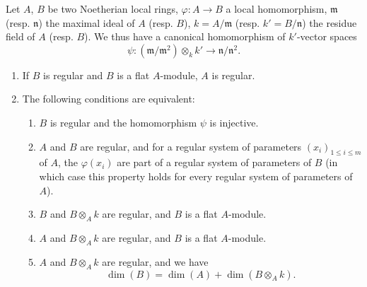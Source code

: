\begin{proposition}[17.3.3]
\label{0.17.3.3}
Let $A$, $B$ be two Noetherian local rings, $\varphi:A\to B$ a local homomorphism, $\mathfrak{m}$ (resp. $\mathfrak{n}$) the maximal ideal of $A$ (resp. $B$), $k=A/\mathfrak{m}$ (resp. $k'=B/\mathfrak{n}$) the residue field of $A$ (resp. $B$).
We thus have a canonical homomorphism of $k'$-vector spaces
\[
\label{0.17.3.3.1}
  \psi:(\mathfrak{m}/\mathfrak{m}^2)\otimes_k k'\to\mathfrak{n}/\mathfrak{n}^2.
  \tag{17.3.3.1}
\]
\begin{enumerate}
  \item[{\rm(i)}] If $B$ is regular and $B$ is a flat $A$-module, $A$ is regular.
  \item[{\rm(ii)}] The following conditions are equivalent:
  \begin{enumerate}
    \item[{\rm a)}] $B$ is regular and the homomorphism $\psi$  is injective.
    \item[{\rm b)}] $A$ and $B$ are regular, and for a regular system of parameters $(x_i)_{1\leq i\leq m}$ of $A$, the $\varphi(x_i)$ are part of a regular system of parameters of $B$ (in which case this property holds for every regular system of parameters of $A$).
    \item[{\rm c)}] $B$ and $B\otimes_A k$ are regular, and $B$ is a flat $A$-module.
    \item[{\rm d)}] $A$ and $B\otimes_A k$ are regular, and $B$ is a flat $A$-module.
    \item[{\rm e)}] $A$ and $B\otimes_A k$ are regular, and we have
    \[
    \label{0.17.3.3.2}
      \dim(B)=\dim(A)+\dim(B\otimes_A k).
      \tag{17.3.3.2}
    \]
  \end{enumerate}
\end{enumerate}
\end{proposition}

